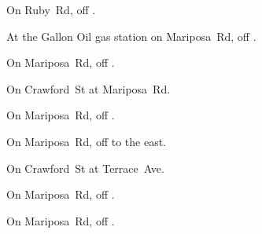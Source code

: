 
\begin{LocationList}

On Ruby~Rd, off  .

At the Gallon Oil gas station on Mariposa~Rd, off  .

On Mariposa~Rd, off  .

On Crawford~St at Mariposa~Rd.

On Mariposa~Rd, off  .

On Mariposa~Rd, off   to the east.

\Location{\TruckStop \Gas \Rest}
On Crawford~St at Terrace~Ave.

On Mariposa~Rd, off  .

On Mariposa~Rd, off  .

\end{LocationList}
